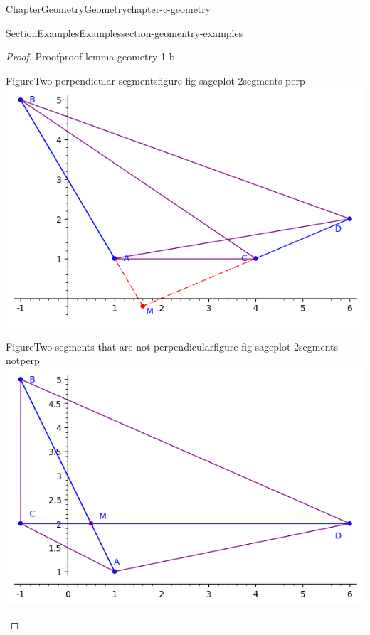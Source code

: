 \documentclass[oneside,10pt,]{book}
\numberwithin{equation}{section}
\begin{document}
\begin{chapterptx}{Chapter}{Geometry}{}{Geometry}{}{}{chapter-c-geometry}
\begin{sectionptx}{Section}{Examples}{}{Examples}{}{}{section-geomentry-examples}
\begin{proof}{Proof}{}{proof-lemma-geometry-1-b}
\begin{sidebyside}{2}{0}{0}{0}
\begin{sbspanel}{0.5}
\begin{panelfigureptx}{Figure}{Two perpendicular segments}{figure-fig-sageplot-2segments-perp}{}
\includegraphics[width=\linewidth]{images/sageplot-2segments-perp.png}
\tcblower
\end{panelfigureptx}%
\end{sbspanel}%
\begin{sbspanel}{0.5}%
\begin{panelfigureptx}{Figure}{Two segments that are not perpendicular}{figure-fig-sageplot-2segments-notperp}{}%
\includegraphics[width=\linewidth]{images/sageplot-2segments-notperp.png}
\tcblower
\end{panelfigureptx}%
\end{sbspanel}%
\end{sidebyside}%
\end{proof}
\end{sectionptx}
%
%
\typeout{************************************************}
\typeout{************************************************}

\end{chapterptx}
\end{document}
